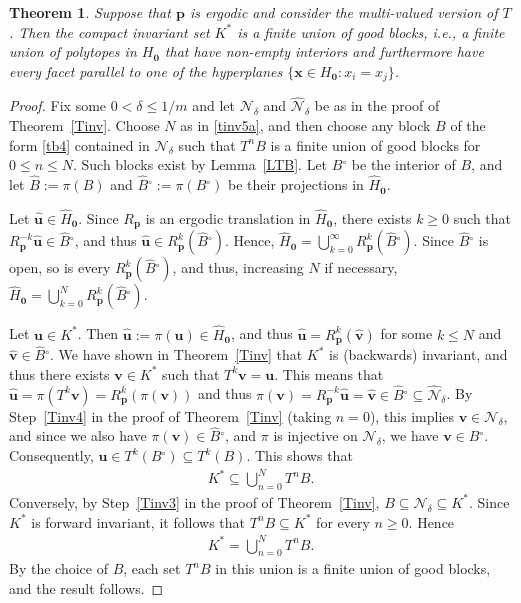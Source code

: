 \documentclass[11pt,reqno,tbtags,a4paper]{amsart}
\numberwithin{equation}{section}
\renewcommand\le{\leq}
\renewcommand\ge{\geq}
\renewcommand\leq{\leqslant}
\renewcommand\geq{\geqslant}
\theoremstyle{plain}%
\newtheorem{theorem}{Theorem}[section]
\theoremstyle{definition}
\theoremstyle{remark}
\newcommand{\refT}[1]{Theorem~\ref{#1}}
\newcommand{\refL}[1]{Lemma~\ref{#1}}
\newcommand{\refStep}[1]{Step~\ref{#1}}
\newcommand\set[1]{\ensuremath{\{#1\}}}
\newcommand\inter{\ensuremath{^\circ}}
\newcommand\gd{\delta}
\newcommand\cN{\mathcal N}
\newcommand\Ho{H_{\0}}
\newcommand\hHo{\hH_{\0}}
\newcommand\vp{\mathbf{p}}
\newcommand\vu{\mathbf{u}}
\newcommand\hvu{{\hat{\mathbf{u}}}}
\newcommand\vv{\mathbf{v}}
\newcommand\hvv{{\hat{\mathbf{v}}}}
\newcommand\vx{\mathbf{x}}
\newcommand\hH{\widehat{H}}
\newcommand\hcN{\widehat{\cN}}
\newcommand\Kx{K^*}
\newcommand\hB{\widehat B}
\newcommand\hBo{\hB\inter}
\newcommand\Bo{B\inter}
\newcommand\0{{\boldsymbol 0}}
\newcommand\1{{\boldsymbol 1}}
\begin{document}
\begin{theorem}\label{TB}
Suppose that $\vp$ is ergodic and consider the multi-valued version of $T$.
Then the compact invariant set $\Kx$
is a finite union of good blocks,
i.e., a finite union of polytopes in $\Ho$
that have non-empty interiors and furthermore have every facet parallel to
one of the hyperplanes  $\set{\vx\in\Ho:x_i=x_j}$. 
\end{theorem}
\begin{proof}

Fix some $0<\gd\le 1/m$ and let 
 $\cN_\gd$ and $\hcN_\gd$ be as in the proof of \refT{Tinv}.
Choose $N$ as in \eqref{tinv5a}, and then choose any block $B$ of the form
\eqref{tb4} contained in $\cN_\gd$ such that $T^nB$ is a finite union of
good blocks for $0\le n\le N$. Such blocks exist by \refL{LTB}.
Let $\Bo$ be the interior of $B$, and let
$\hB:=\pi(B)$ and 
$\hBo:=\pi(\Bo)$ be their projections in $\hHo$. 

Let $\hvu\in \hHo$.
Since $R_\vp$ is an ergodic
translation in $\hHo$, there exists $k\ge0$ such
that $R_\vp^{-k}\hvu\in \hBo$, and thus
$\hvu\in R_\vp^{k}(\hBo)$.
Hence, $\hHo=\bigcup_{k=0}^\infty R_\vp^k(\hBo)$.
Since $\hBo$ is open, so is every $R_\vp^k(\hBo)$,
and thus, increasing $N$ if necessary,
$\hHo=\bigcup_{k=0}^N R_\vp^k(\hBo)$.

Let $\vu\in \Kx$. Then $\hvu:=\pi(\vu)\in\hHo$, 
and thus $\hvu=R_\vp^k(\hvv)$ for some $k\le N$ and $\hvv\in\hBo$.
%
We have shown in \refT{Tinv} that $\Kx$ is (backwards) invariant, and thus
there exists 
$\vv\in\Kx$ such that $T^k\vv=\vu$.
This means that $\hvu=\pi(T^k\vv)=R_\vp^k(\pi(\vv))$ and thus
$\pi(\vv)=R_\vp^{-k}\hvu=\hvv\in \hBo \subseteq\hcN_\gd$.
By \refStep{Tinv4} in the proof of \refT{Tinv}
(taking $n=0$), this implies $\vv\in\cN_\gd$, and since we
also have $\pi(\vv)\in\hBo$, and $\pi$ is injective on $\cN_\gd$, we have
$\vv\in\Bo$. Consequently, $\vu\in T^k(\Bo)\subseteq T^k(B)$.
This shows that
\begin{align}
  \Kx\subseteq\bigcup_{n=0}^N T^n B.
\end{align}
Conversely, by \refStep{Tinv3} in the proof of \refT{Tinv},
$B\subseteq\cN_\gd\subseteq\Kx$.  Since $\Kx$ is forward invariant, it follows
that $T^nB\subseteq\Kx$ for every $n\ge0$.  Hence
\begin{align}
  \Kx=\bigcup_{n=0}^N T^n B.
\end{align}
By the choice of $B$, each set $T^nB$ in this union is a finite union of
good blocks, and the result follows.
\end{proof}
\end{document}
